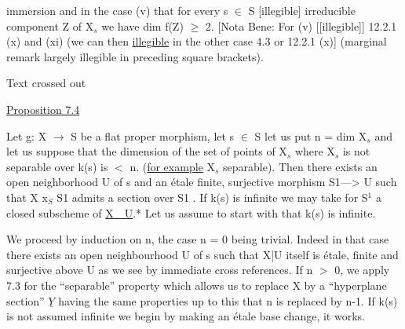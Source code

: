
immersion and in the case (v) that for every s $\in$ S [illegible]
irreducible component Z of X$_s$ we have dim f(Z) $\geq$ 2.
[Nota Bene:  For (v) [[illegible]] 12.2.1   (x) and (xi) (we can
then \uline{illegible} in the other case 4.3 or 12.2.1 (x)] (marginal
remark largely illegible in preceding square brackets).

Text crossed out

\uline{Proposition 7.4}

Let g:   X $\to$ S be a flat proper morphism, let s $\in$ S let us
put n = dim X$_s$ and let us suppose that the dimension of the set of
points of X$_s$ where X$_s$ is not separable over k(s) is  $<$ n.  (\uline{for
example}  X$_s$   separable).  Then there exists an open neighborhood
U of s and an \'etale finite, surjective morphism S1---> U such that
X \quad x$_S$ \quad S1 \quad admits a section over S1 .  If k(s) is infinite we
may take for S$^1$ a closed subscheme of \uline{X\ \ U}.*  Let us assume to
start with that k(s) is infinite.

We proceed by induction on n, the case n = 0 being trivial.
Indeed in that case there exists an open neighbourhood U of s such
that X|U itself is \'etale, finite and surjective above U as we see
by immediate cross references.  If n $>$ 0, we apply 7.3 for the
``separable'' property which allows us to replace X by a ``hyperplane
section'' $\underline{Y}$ having the same properties up to this that n is
replaced by n-1.  If k(s) is not assumed infinite we begin by
making an \'etale base change, it works.

